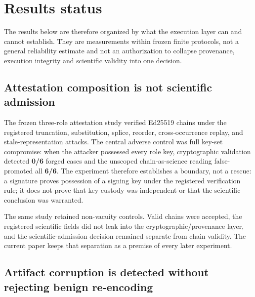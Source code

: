 \section{Results status}

\begin{center}
\end{center}

The results below are therefore organized by what the execution layer can and
cannot establish. They are measurements within frozen finite protocols, not a
general reliability estimate and not an authorization to collapse provenance,
execution integrity and scientific validity into one decision.

\subsection{Attestation composition is not scientific admission}
\label{sec:attestation-composition}

The frozen three-role attestation study verified Ed25519 chains under the
registered truncation, substitution, splice, reorder, cross-occurrence replay,
and stale-representation attacks. The central adverse control was full key-set
compromise: when the attacker possessed every role key, cryptographic validation
detected \textbf{0/6} forged cases and the unscoped chain-as-science reading
false-promoted all \textbf{6/6}. The experiment therefore establishes a boundary,
not a rescue: a signature proves possession of a signing key under the registered
verification rule; it does not prove that key custody was independent or that the
scientific conclusion was warranted.

The same study retained non-vacuity controls. Valid chains were accepted, the
registered scientific fields did not leak into the cryptographic/provenance layer,
and the scientific-admission decision remained separate from chain validity. The
current paper keeps that separation as a premise of every later experiment.

\subsection{Artifact corruption is detected without rejecting benign re-encoding}


